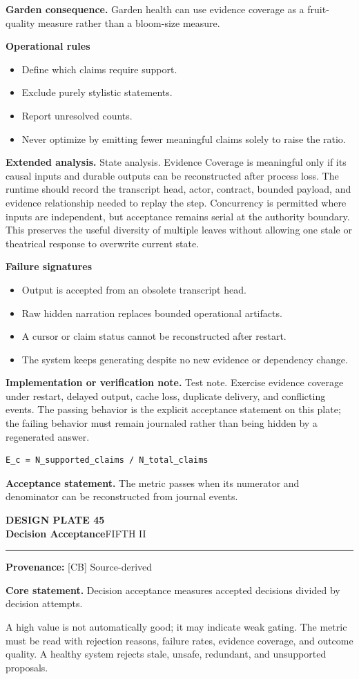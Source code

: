 \documentclass[10pt,letterpaper,oneside]{article}
\newcommand{\prov}[1]{\textcolor{gardenBlue}{\sffamily\footnotesize\textbf{Provenance:} #1}}
\newcommand{\platetitle}[3]{%
  \begin{minipage}[t][0.54in][t]{\textwidth}
  {\sffamily\bfseries\color{gardenDeep}\fontsize{9}{10}\selectfont DESIGN PLATE #1}\\[-1pt]
  {\sffamily\bfseries\color{gardenInk}\fontsize{16.5}{18}\selectfont #2}\hfill{\sffamily\color{gardenGreen}\large #3}
  \end{minipage}\vspace{-2pt}\hrule\vspace{5pt}}
\begin{document}
\textbf{Garden consequence.} Garden health can use evidence coverage as a fruit-quality measure rather than a bloom-size measure.

\textbf{Operational rules}
\begin{itemize}
\item Define which claims require support.
\item Exclude purely stylistic statements.
\item Report unresolved counts.
\item Never optimize by emitting fewer meaningful claims solely to raise the ratio.
\end{itemize}
\textbf{Extended analysis.} State analysis. Evidence Coverage is meaningful only if its causal inputs and durable outputs can be reconstructed after process loss. The runtime should record the transcript head, actor, contract, bounded payload, and evidence relationship needed to replay the step. Concurrency is permitted where inputs are independent, but acceptance remains serial at the authority boundary. This preserves the useful diversity of multiple leaves without allowing one stale or theatrical response to overwrite current state.

\textbf{Failure signatures}
\begin{itemize}
\item Output is accepted from an obsolete transcript head.
\item Raw hidden narration replaces bounded operational artifacts.
\item A cursor or claim status cannot be reconstructed after restart.
\item The system keeps generating despite no new evidence or dependency change.
\end{itemize}
\textbf{Implementation or verification note.} Test note. Exercise evidence coverage under restart, delayed output, cache loss, duplicate delivery, and conflicting events. The passing behavior is the explicit acceptance statement on this plate; the failing behavior must remain journaled rather than being hidden by a regenerated answer.

\begin{lstlisting}
E_c = N_supported_claims / N_total_claims
\end{lstlisting}
\begin{acceptbox}
\textbf{Acceptance statement.} The metric passes when its numerator and denominator can be reconstructed from journal events.
\end{acceptbox}
\newpage
\platetitle{45}{Decision Acceptance}{FIFTH II}
\prov{[CB] Source-derived}
\fontsize{8.85}{10.45}\selectfont
\begin{corebox}
\textbf{Core statement.} Decision acceptance measures accepted decisions divided by decision attempts.
\end{corebox}
A high value is not automatically good; it may indicate weak gating. The metric must be read with rejection reasons, failure rates, evidence coverage, and outcome quality. A healthy system rejects stale, unsafe, redundant, and unsupported proposals.
\end{document}
